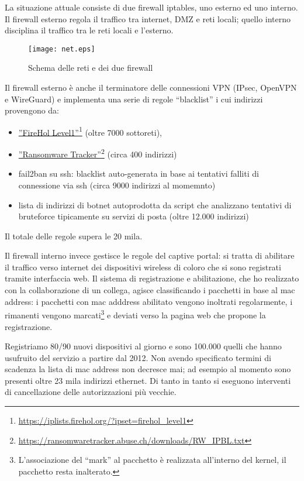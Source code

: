 La situazione attuale consiste di due firewall iptables, uno esterno ed uno
interno.  Il firewall esterno regola il traffico tra internet, DMZ e reti
locali; quello interno disciplina il traffico tra le reti locali e l'esterno.
\begin{figure}[H]
\begin{center}
    \texttt{[image: net.eps]}
    \caption{Schema delle reti e dei due firewall}
    \label{fig:rete}
\end{center}
\end{figure}
\noindent Il firewall esterno \`e anche il terminatore delle connessioni VPN (IPsec,
OpenVPN e WireGuard) e implementa una serie di regole ``blacklist'' i cui
indirizzi provengono da:
\begin{itemize}
    \item \href{https://iplists.firehol.org/?ipset=firehol\_level1}{''FireHol
        Level1''}\footnote{\url{https://iplists.firehol.org/?ipset=firehol\_level1}} (oltre
    7000 sottoreti),
    \item \href{https://ransomwaretracker.abuse.ch/downloads/RW\_IPBL.txt}{''Ransomware
        Tracker''}\footnote{\url{https://ransomwaretracker.abuse.ch/downloads/RW\_IPBL.txt}}
    (circa 400 indirizzi)
    \item fail2ban su ssh: blacklist auto-generata in base ai tentativi
    falliti di connessione via ssh (circa 9000 indirizzi al momemnto)
    \item lista di indirizzi di botnet autoprodotta da script che analizzano
    tentativi di bruteforce tipicamente su servizi di posta (oltre 12.000
    indirizzi)
\end{itemize}
Il totale delle regole supera le 20 mila.

Il firewall interno invece gestisce le regole del captive portal: si tratta di
abilitare il traffico verso internet dei dispositivi wireless di coloro che si
sono registrati tramite interfaccia web.
Il sistema di registrazione e abilitazione, che ho realizzato con la
collaborazione di un collega, agisce classificando i pacchetti in base al mac
address: i pacchetti con mac adddress abilitato vengono inoltrati
regolarmente, i rimanenti vengono marcati\footnote{L'associazione del ``mark''
al pacchetto è realizzata all'interno del kernel, il pacchetto resta
inalterato.} e deviati verso la pagina web che propone la registrazione.

Registriamo 80/90 nuovi dispositivi al giorno e sono 100.000 quelli
che hanno usufruito del servizio a partire dal 2012.  Non avendo specificato
termini di scadenza la lista di mac address non decresce mai; ad esempio al
momento sono presenti oltre 23 mila indirizzi ethernet.  Di tanto in tanto si
eseguono interventi di cancellazione delle autorizzazioni pi\`u vecchie.

